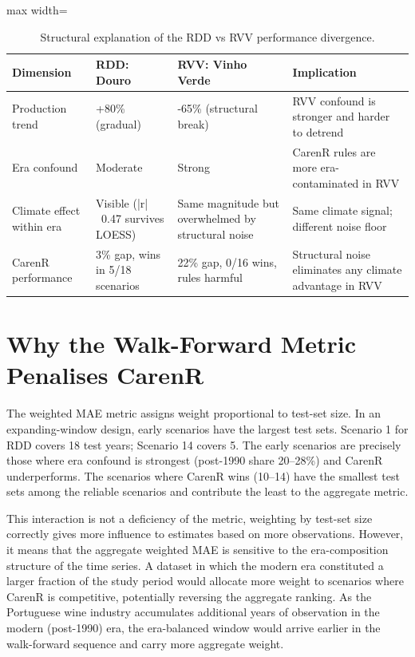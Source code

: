 \begin{table}[htbp]
  \centering
  \caption{Structural explanation of the RDD vs RVV performance divergence.}\label{tab:ch6a_1}
  \small
  \begin{adjustbox}{max width=\textwidth}
    \begin{tabularx}{\textwidth}{p{2.9cm}|p{2.7cm}|p{3.3cm}|X}
  \toprule
  Dimension & RDD: Douro & RVV: Vinho Verde & Implication \\
  \midrule
  Production trend & +80\% (gradual) & -65\% (structural break) & RVV confound is stronger and harder to detrend \\
  Era confound & Moderate & Strong & CarenR rules are more era-contaminated in RVV \\
  Climate effect within era & Visible (|r|~0.47 survives LOESS) & Same magnitude but overwhelmed by structural noise & Same climate signal; different noise floor \\
  CarenR performance & 3\% gap, wins in 5/18 scenarios & 22\% gap, 0/16 wins, rules harmful & Structural noise eliminates any climate advantage in RVV \\
  \bottomrule
\end{tabularx}
  \end{adjustbox}

\end{table}



\section{Why the Walk-Forward Metric Penalises CarenR}\label{sec:why_the_walkforward_metric}

The weighted MAE metric assigns weight proportional to test-set size. In an expanding-window design, early scenarios have the largest test sets. Scenario 1 for RDD covers 18 test years; Scenario 14 covers 5. The early scenarios are precisely those where era confound is strongest (post-1990 share 20--28\%) and CarenR underperforms. The scenarios where CarenR wins (10--14) have the smallest test sets among the reliable scenarios and contribute the least to the aggregate metric.

This interaction is not a deficiency of the metric, weighting by test-set size correctly gives more influence to estimates based on more observations. However, it means that the aggregate weighted MAE is sensitive to the era-composition structure of the time series. A dataset in which the modern era constituted a larger fraction of the study period would allocate more weight to scenarios where CarenR is competitive, potentially reversing the aggregate ranking. As the Portuguese wine industry accumulates additional years of observation in the modern (post-1990) era, the era-balanced window would arrive earlier in the walk-forward sequence and carry more aggregate weight.


